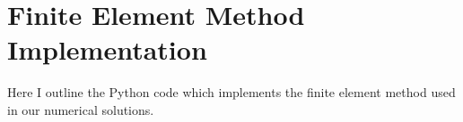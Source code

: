 \chapter{Finite Element Method Implementation}

Here I outline the Python code which implements the finite
element method used in our numerical solutions.

